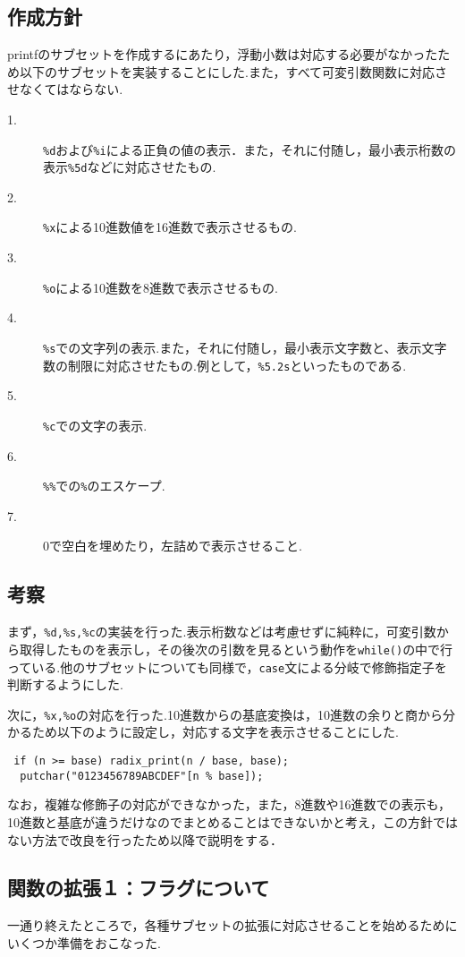\documentclass[a4j,11pt]{jarticle}
\begin{document}
  \subsection{作成方針}
printfのサブセットを作成するにあたり，浮動小数は対応する必要がなかったため以下のサブセットを実装することにした.また，すべて可変引数関数に対応させなくてはならない.
\begin{description}
\item[1.]\verb|%d|および\verb|%i|による正負の値の表示．また，それに付随し，最小表示桁数の表示\verb|%5d|などに対応させたもの.
\item[2.]\verb|%x|による10進数値を16進数で表示させるもの.
\item[3.]\verb|%o|による10進数を8進数で表示させるもの.
\item[4.]\verb|%s|での文字列の表示.また，それに付随し，最小表示文字数と、表示文字数の制限に対応させたもの.例として，\verb|%5.2s|といったものである.
\item[5.]\verb|%c|での文字の表示.
\item[6.]\verb|%%|での\verb|%|のエスケープ.
\item[7.]0で空白を埋めたり，左詰めで表示させること.
\end{description}
  \subsection{考察}
まず，\verb|%d,%s,%c|の実装を行った.表示桁数などは考慮せずに純粋に，可変引数から取得したものを表示し，その後次の引数を見るという動作を\verb|while()|の中で行っている.他のサブセットについても同様で，\verb|case|文による分岐で修飾指定子を判断するようにした.

次に，\verb|%x,%o|の対応を行った.10進数からの基底変換は，10進数の余りと商から分かるため以下のように設定し，対応する文字を表示させることにした.
\begin{verbatim}
 if (n >= base) radix_print(n / base, base);
  putchar("0123456789ABCDEF"[n % base]);
\end{verbatim}
なお，複雑な修飾子の対応ができなかった，また，8進数や16進数での表示も，10進数と基底が違うだけなのでまとめることはできないかと考え，この方針ではない方法で改良を行ったため以降で説明をする．
\subsection{関数の拡張１：フラグについて}
一通り終えたところで，各種サブセットの拡張に対応させることを始めるためにいくつか準備をおこなった.
\end{document}
